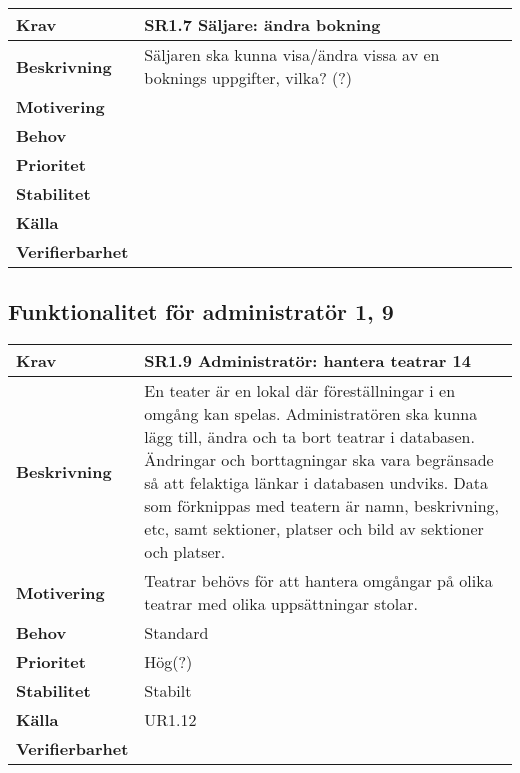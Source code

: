 \documentclass[a4paper, twoside, 11pt, titlepage]{article}
\begin{document}
	\begin{tabular} { p{2.6cm} p{12.5cm} }
		\hline
		\sffamily\textbf{Krav} & \sffamily\textbf{SR1.7 Säljare: ändra bokning } \\
		\hline
		\sffamily\textbf{Beskrivning} & Säljaren ska kunna visa/ändra vissa av en boknings uppgifter, vilka? (?)  \\
		\hline
		\sffamily\textbf{Motivering} &   \\
		\hline
		\sffamily\textbf{Behov} &   \\
		\hline
		\sffamily\textbf{Prioritet} &   \\
		\hline
		\sffamily\textbf{Stabilitet} &   \\
		\hline
		\sffamily\textbf{Källa} &   \\
		\hline
		\sffamily\textbf{Verifierbarhet} &   \\
		\hline
	\end{tabular}


	\subsection{Funktionalitet för administratör 1, 9}


	\begin{tabular} { p{2.6cm} p{12.5cm} }
		\hline
		\sffamily\textbf{Krav} & \sffamily\textbf{SR1.9 Administratör: hantera teatrar 14 } \\
		\hline
		\sffamily\textbf{Beskrivning} & En teater är en lokal där föreställningar i en omgång kan spelas. Administratören ska kunna lägg till, ändra och ta bort teatrar i databasen. Ändringar och borttagningar ska vara begränsade så att felaktiga länkar i databasen undviks. Data som förknippas med teatern är namn, beskrivning, etc, samt sektioner, platser och bild av sektioner och platser.  \\
		\hline
		\sffamily\textbf{Motivering} & Teatrar behövs för att hantera omgångar på olika teatrar med olika uppsättningar stolar.  \\
		\hline
		\sffamily\textbf{Behov} & Standard  \\
		\hline
		\sffamily\textbf{Prioritet} & Hög(?)  \\
		\hline
		\sffamily\textbf{Stabilitet} & Stabilt  \\
		\hline
		\sffamily\textbf{Källa} & UR1.12  \\
		\hline
		\sffamily\textbf{Verifierbarhet} &   \\
		\hline
	\end{tabular}
	\vspace{6mm}
\end{document}
